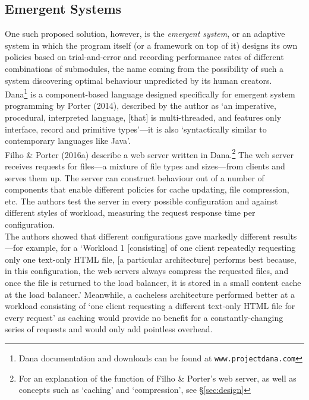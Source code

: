 \documentclass[compsoc,12pt,a4paper]{IEEEtran}
\begin{document}
		\subsection{Emergent Systems}
		
			One such proposed solution, however, is the \textit{emergent system}, or an adaptive system in which the program itself (or a framework on top of it) designs its own policies based on trial-and-error and recording performance rates of different combinations of submodules, the name coming from the possibility of such a system discovering optimal behaviour unpredicted by its human creators.\\
			Dana\footnote{Dana documentation and downloads can be found at \lstinline|www.projectdana.com|} is a component-based language designed specifically for emergent system programming by Porter (2014), described by the author as `an imperative, procedural, interpreted language, [that] is multi-threaded, and features only interface, record and primitive types'\cite{dana}---it is also `syntactically similar to contemporary languages like Java'\cite{dana}.\\
			Filho \& Porter (2016a) describe a web server written in Dana.\footnote{For an explanation of the function of Filho \& Porter's web server, as well as concepts such as `caching' and `compression', see \S \ref{sec:design}} The web server receives requests for files---a mixture of file types and sizes---from clients and serves them up. The server can construct behaviour out of a number of components that enable different policies for cache updating, file compression, etc. The authors test the server in every possible configuration and against different styles of workload, measuring the request response time per configuration.\\
			The authors showed that different configurations gave markedly different results---for example, for a `Workload 1 [consisting] of one client repeatedly requesting only one text-only HTML file, [a particular architecture] performs best because, in this configuration, the web servers always compress the requested files, and once the file is returned to the load balancer, it is stored in a small content  cache  at  the  load  balancer.'\cite{machinecentric} Meanwhile, a cacheless architecture performed better at a workload consisting of `one client requesting a different text-only HTML file for every request'\cite{machinecentric} as caching would provide no benefit for a constantly-changing series of requests and would only add pointless overhead.\\
\end{document}
